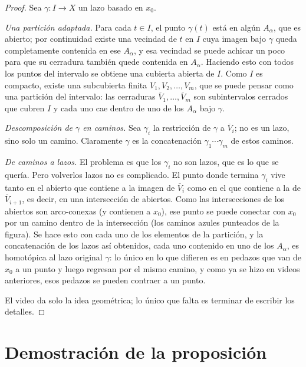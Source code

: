 \documentclass[11pt]{article}
\begin{document}
\begin{proof}
Sea $\gamma\colon I\to X$ un lazo basado en $x_0$.

\medskip\noindent\textit{Una partición adaptada.}
Para cada $t\in I$, el punto $\gamma(t)$ está en algún $A_\alpha$, que es abierto; por continuidad existe una vecindad de $t$ en $I$ cuya imagen bajo $\gamma$ queda completamente contenida en ese $A_\alpha$, y esa vecindad se puede achicar un poco para que su cerradura también quede contenida en $A_\alpha$. Haciendo esto con todos los puntos del intervalo se obtiene una cubierta abierta de $I$. Como $I$ es compacto, existe una subcubierta finita $V_1,V_2,\dots,V_m$, que se puede pensar como una partición del intervalo: las cerraduras $\overline{V}_1,\dots,\overline{V}_m$ son subintervalos cerrados que cubren $I$ y cada uno cae dentro de uno de los $A_\alpha$ bajo $\gamma$.

\medskip\noindent\textit{Descomposición de $\gamma$ en caminos.}
Sea $\gamma_i$ la restricción de $\gamma$ a $\overline{V}_i$; no es un lazo, sino solo un camino. Claramente $\gamma$ es la concatenación $\gamma_1\cdots\gamma_m$ de estos caminos.

\medskip\noindent\textit{De caminos a lazos.}
El problema es que los $\gamma_i$ no son lazos, que es lo que se quería. Pero volverlos lazos no es complicado. El punto donde termina $\gamma_i$ vive tanto en el abierto que contiene a la imagen de $\overline{V}_i$ como en el que contiene a la de $\overline{V}_{i+1}$, es decir, en una intersección de abiertos. Como las intersecciones de los abiertos son arco-conexas (y contienen a $x_0$), ese punto se puede conectar con $x_0$ por un camino dentro de la intersección (los caminos azules punteados de la figura). Se hace esto con cada uno de los elementos de la partición, y la concatenación de los lazos así obtenidos, cada uno contenido en uno de los $A_\alpha$, es homotópica al lazo original $\gamma$: lo único en lo que difieren es en pedazos que van de $x_0$ a un punto y luego regresan por el mismo camino, y como ya se hizo en videos anteriores, esos pedazos se pueden contraer a un punto.

El video da solo la idea geométrica; lo único que falta es terminar de escribir los detalles.
\end{proof}

\section*{Demostración de la proposición}
\end{document}
